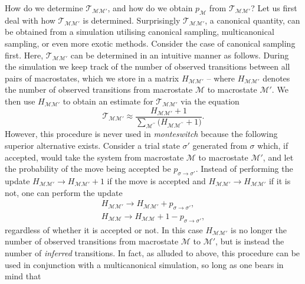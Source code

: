 \documentclass{report}
\begin{document}
How do we determine $\mathcal{T}_{\mathcal{MM}'}$, and how do we obtain $p_{\mathcal{M}}$ from $\mathcal{T}_{\mathcal{MM}'}$? Let us first deal with how
$\mathcal{T}_{\mathcal{MM}'}$ is determined.
Surprisingly $\mathcal{T}_{\mathcal{MM}'}$, a canonical quantity, can be obtained from a simulation utilising canonical sampling, multicanonical sampling,
or even more exotic methods. Consider the case of canonical sampling first.
Here, $\mathcal{T}_{\mathcal{MM}'}$ can be determined in an intuitive manner as follows. During the simulation we keep track of the 
number of observed transitions between all pairs of macrostates, which we store in a matrix $H_{\mathcal{M}\mathcal{M}'}$ -- where $H_{\mathcal{M}\mathcal{M}'}$
denotes the number of observed transitions from macrostate $\mathcal{M}$ to macrostate $\mathcal{M}'$. We then use $H_{\mathcal{M}\mathcal{M}'}$ to obtain
an estimate for $\mathcal{T}_{\mathcal{M}\mathcal{M}'}$ via the equation
\begin{equation}\label{T_estimate}
\mathcal{T}_{\mathcal{M}\mathcal{M}'}\approx \frac{H_{\mathcal{M}\mathcal{M}'}+1}
{\displaystyle\sum_{\mathcal{M}^{\prime\prime}}\bigl(H_{\mathcal{M}\mathcal{M}^{\prime\prime}}+1\bigr)}.
\end{equation}
However, this procedure is never used in \emph{monteswitch} because the following superior alternative exists. Consider a trial state $\sigma'$ 
generated from $\sigma$ which, if accepted, would take the system from macrostate $\mathcal{M}$ to macrostate $\mathcal{M}'$, and let the probability 
of the move being accepted be $p_{\sigma\to\sigma'}$. Instead of performing the update $H_{\mathcal{M}\mathcal{M}'}\to H_{\mathcal{M}\mathcal{M}'}+1$ if the move is 
accepted and $H_{\mathcal{M}\mathcal{M}'}\to H_{\mathcal{M}\mathcal{M}'}$ if it is not, one can perform the update 
\begin{equation}
\begin{split}
H_{\mathcal{M}\mathcal{M}'}\to H_{\mathcal{M}\mathcal{M}'}+p_{\sigma\to\sigma'}, \\
H_{\mathcal{M}\mathcal{M}}\to H_{\mathcal{M}\mathcal{M}}+1-p_{\sigma\to\sigma'},
\end{split}
\end{equation} 
regardless of whether it is accepted or not. In this case $H_{\mathcal{M}\mathcal{M}'}$ is no longer the number of observed transitions from macrostate 
$\mathcal{M}$ to $\mathcal{M}'$, but is instead the number of \emph{inferred} transitions. 
In fact, as alluded to above, this procedure can be used in conjunction with a multicanonical simulation, so long as one bears in mind that
\end{document}
